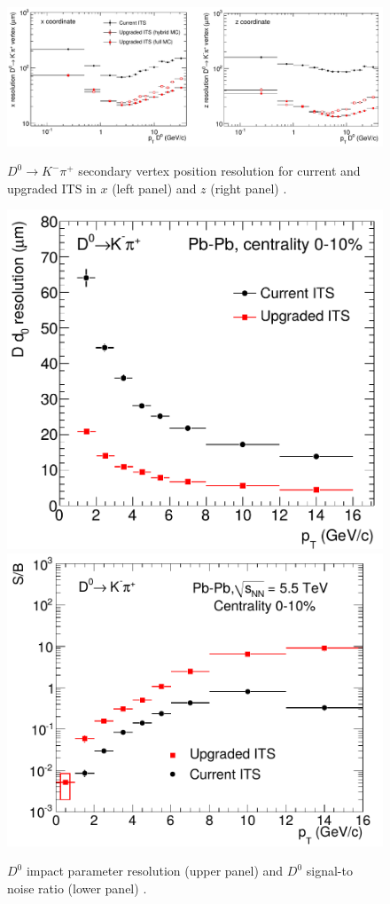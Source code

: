 %
\begin{figure}
  \centering
  \includegraphics[scale=0.3]{figures/D0res.png}
  \caption{$D^0 \rightarrow K^-\pi^+$ secondary vertex position resolution for current and upgraded ITS in $x$ (left panel) and $z$ (right panel) \cite{uptdr}.}
  \label{fig:D0res}
  \vspace{1 cm}
  \centering
  {\includegraphics[scale=0.32]{figures/D0impres.png}}\quad
  {\includegraphics[scale=0.32]{figures/SoverB.png}}
  \caption{$D^0$ impact parameter resolution (upper panel) and $D^0$ signal-to noise ratio (lower panel) \cite{uptdr}.}
  \label{fig:d0stuff}
\end{figure}
